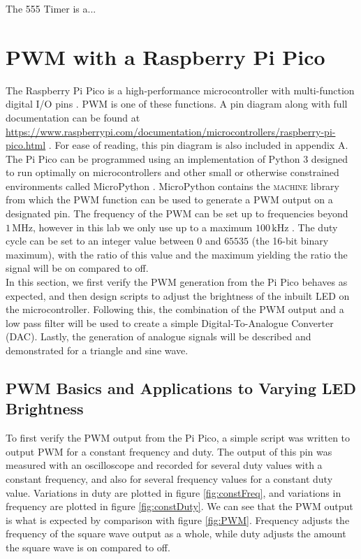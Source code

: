 \documentclass[%
 reprint,
 amsmath,amssymb,
 aps,
]{revtex4-2}
\begin{document}
    The 555 Timer is a...


\section{PWM with a Raspberry Pi Pico}
The Raspberry Pi Pico is a high-performance microcontroller with multi-function digital I/O pins \cite{Pi, ucd}. PWM is one of these functions. A pin diagram along with full documentation can be found at \url{https://www.raspberrypi.com/documentation/microcontrollers/raspberry-pi-pico.html} \cite{Pi}. For ease of reading, this pin diagram is also included in appendix A.\\

The Pi Pico can be programmed using an implementation of Python 3 designed to run optimally on microcontrollers and other small or otherwise constrained environments called MicroPython \cite{micropython}. MicroPython contains the \textsc{machine} library from which the \textsc{PWM} function can be used to generate a PWM output on a designated pin. The frequency of the PWM can be set up to frequencies beyond $1\,\text{MHz}$, however in this lab we only use up to a maximum $100 \,\text{kHz}$ \cite{ucd}. The duty cycle can be set to an integer value between $0$ and $65535$ (the 16-bit binary maximum), with the ratio of this value and the maximum yielding the ratio the signal will be on compared to off.\\

In this section, we first verify the PWM generation from the Pi Pico behaves as expected, and then design scripts to adjust the brightness of the inbuilt LED on the microcontroller. Following this, the combination of the PWM output and a low pass filter will be used to create a simple Digital-To-Analogue Converter (DAC). Lastly, the generation of analogue signals will be described and demonstrated for a triangle and sine wave.
    
    \subsection{PWM Basics and Applications to Varying LED Brightness}
    To first verify the PWM output from the Pi Pico, a simple script was written to output PWM for a constant frequency and duty. The output of this pin was measured with an oscilloscope and recorded for several duty values with a constant frequency, and also for several frequency values for a constant duty value. Variations in duty are plotted in figure \ref{fig:constFreq}, and variations in frequency are plotted in figure \ref{fig:constDuty}. We can see that the PWM output is what is expected by comparison with figure \ref{fig:PWM}. Frequency adjusts the frequency of the square wave output as a whole, while duty adjusts the amount the square wave is on compared to off.\\
\end{document}
